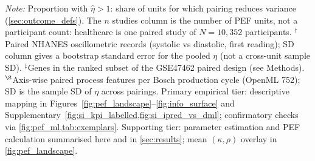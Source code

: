 
\begin{table}[p]
  \centering
  \caption{Validation results across domains.}
  \label{tab:validation}
  \small
  \normalsize

  \medskip
  \begin{minipage}{0.95\linewidth}\small
    \textit{Note:} Proportion with $\hat\eta>1$: share of units for which pairing reduces variance (\cref{sec:outcome_defs}). The $n$ studies column is the number of PEF units, not a participant count: healthcare is one paired study of $N=10{,}352$ participants. $^{\dagger}$Paired {NHANES} oscillometric records (systolic vs diastolic, first reading); SD column gives a bootstrap standard error for the pooled $\eta$ (not a cross-unit sample SD). $^{\ddagger}$Genes in the ranked subset of the {GSE47462} paired design (see Methods). $^{\S}$Axis-wise paired process features per {Bosch} production cycle ({OpenML} 752); SD is the sample {SD} of $\eta$ across pairings. Primary empirical tier: descriptive mapping in Figures~\ref{fig:pef_landscape}--\ref{fig:info_surface} and Supplementary~\cref{fig:si_kpi_labelled,fig:si_ipred_vs_dml}; confirmatory checks via \cref{fig:pef_ml,tab:exemplars}. Supporting tier: parameter estimation and PEF calculation summarised here and in \cref{sec:results}; mean $(\kappa,\rho)$ overlay in \cref{fig:pef_landscape}.
  \end{minipage}
\end{table}

